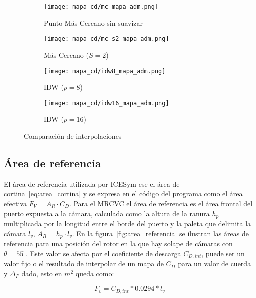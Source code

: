 \begin{figure}
    \centering
    \begin{subfigure}{0.4\textwidth}
        \centering
        \texttt{[image: mapa\_cd/mc\_mapa\_adm.png]}
        \caption{Punto Más Cercano sin suavizar}
    \end{subfigure}
    \hfill
    \begin{subfigure}{0.4\textwidth}
        \centering
        \texttt{[image: mapa\_cd/mc\_s2\_mapa\_adm.png]}
        \caption{Más Cercano ($S=2$)}
    \end{subfigure}
    \hfill
    \begin{subfigure}{0.4\textwidth}
        \centering
        \texttt{[image: mapa\_cd/idw8\_mapa\_adm.png]}
        \caption{IDW ($p=8$)}
    \end{subfigure}
    \hfill
    \begin{subfigure}{0.4\textwidth}
        \centering
        \texttt{[image: mapa\_cd/idw16\_mapa\_adm.png]}
        \caption{IDW ($p=16$)}
    \end{subfigure}
    \caption{Comparación de interpolaciones}\label{fig:mapas_interpolados}
\end{figure}


\subsection{Área de referencia}
%
El área de referencia utilizada por ICESym ese el área de
cortina~\ref{eq:area_cortina} y se expresa en el código del programa como el
área efectiva $F_{V}=A_{R}\cdot C_{D}$.
%
Para el MRCVC el área de referencia es el área frontal del puerto expuesta a la
cámara, calculada como la altura de la ranura $h_{p}$ multiplicada por la
longitud entre el borde del puerto y la paleta que delimita la cámara $l_{v}$,
$A_{R} = h_{p} \cdot l_{{v}}$.
%
En la figura~\ref{fig:area_referencia} se ilustran las áreas de referencia para
una posición del rotor en la que hay solape de cámaras con $\theta = 55^\circ$.
%
Este valor se afecta por el coeficiente de descarga $C_{D,int}$, puede ser un
valor fijo o el resultado de interpolar de un mapa de $C_D$ para un valor de
cuerda y $\Delta_P$ dado, esto en $m^2$ queda como:

\begin{equation}\label{eq:fv}
    F_v = C_{D,int}*0.0294*l_v
\end{equation}

